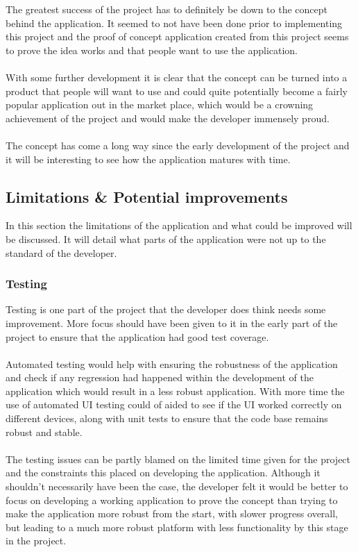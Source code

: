 The greatest success of the project has to definitely be down to the concept behind the application. It seemed to not have been done prior to implementing this project and the proof of concept application created from this project seems to prove the idea works and that people want to use the application.\\
\\
With some further development it is clear that the concept can be turned into a product that people will want to use and could quite potentially become a fairly popular application out in the market place, which would be a crowning achievement of the project and would make the developer immensely proud.\\
\\
The concept has come a long way since the early development of the project and it will be interesting to see how the application matures with time.

\subsection{Limitations \& Potential improvements}

In this section the limitations of the application and what could be improved will be discussed. It will detail what parts of the application were not up to the standard of the developer.

\subsubsection{Testing}

Testing is one part of the project that the developer does think needs some improvement. More focus should have been given to it in the early part of the project to ensure that the application had good test coverage.\\
\\
Automated testing would help with ensuring the robustness of the application and check if any regression had happened within the development of the application which would result in a less robust application. With more time the use of automated UI testing could of aided to see if the UI worked correctly on different devices, along with unit tests to ensure that the code base remains robust and stable.\\
\\
The testing issues can be partly blamed on the limited time given for the project and the constraints this placed on developing the application. Although it shouldn't necessarily have been the case, the developer felt it would be better to focus on developing a working application to prove the concept than trying to make the application more robust from the start, with slower progress overall, but leading to a much more robust platform with less functionality by this stage in the project.

